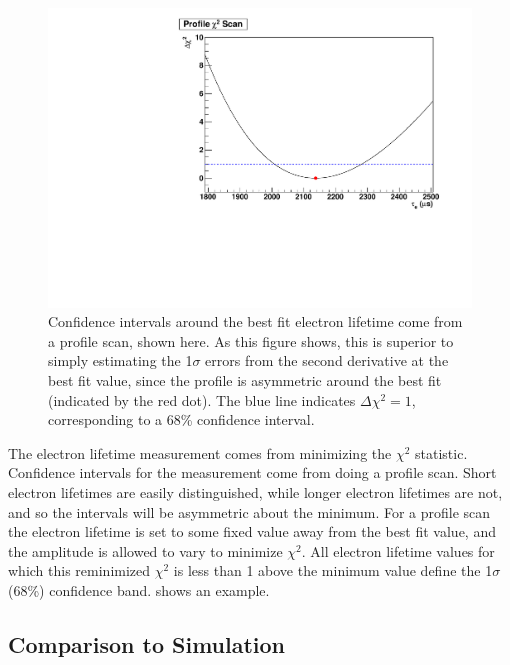 \documentclass[herrin-thesis.tex]{subfiles}
\begin{document}
\begin{figure}[htb]
\centering
\includegraphics[width=0.6\columnwidth]{./plots/el_run4252_profile.pdf}
\caption[A profile scan around the best-fit electron lifetime]{Confidence intervals around the best fit electron lifetime come from a profile scan, shown here. As this figure shows, this is superior to simply estimating the 1\(\sigma\) errors from the second derivative at the best fit value, since the profile is asymmetric around the best fit (indicated by the red dot). The blue line indicates \(\Delta\chi^2 = 1\), corresponding to a 68\% confidence interval.}
\label{fig:el_profileel}
\end{figure}

The electron lifetime measurement comes from minimizing the \(\chi^2\) statistic. Confidence intervals for the measurement come from doing a profile scan. Short electron lifetimes are easily distinguished, while longer electron lifetimes are not, and so the intervals will be asymmetric about the minimum. For a profile scan the electron lifetime is set to some fixed value away from the best fit value, and the amplitude is allowed to vary to minimize \(\chi^2\). All electron lifetime values for which this reminimized \(\chi^2\) is less than 1 above the minimum value define the 1\(\sigma\) (68\%) confidence band.  shows an example.

\subsection{Comparison to Simulation}
\end{document}

